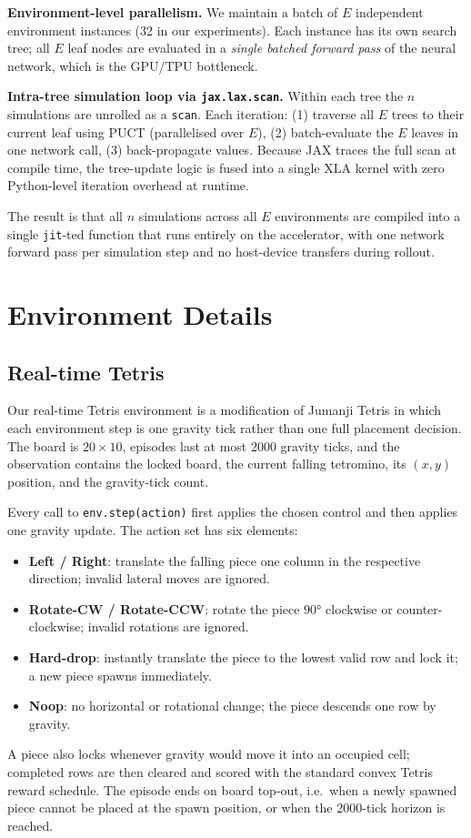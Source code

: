 \textbf{Environment-level parallelism.}
We maintain a batch of $E$ independent environment instances (32 in our experiments).
Each instance has its own search tree; all $E$ leaf nodes are evaluated in a
\emph{single batched forward pass} of the neural network, which is the GPU/TPU
bottleneck.

\textbf{Intra-tree simulation loop via \texttt{jax.lax.scan}.}
Within each tree the $n$ simulations are unrolled as a \texttt{scan}.
Each iteration: (1) traverse all $E$ trees to their current leaf using PUCT
(parallelised over $E$), (2) batch-evaluate the $E$ leaves in one network call,
(3) back-propagate values.
Because JAX traces the full scan at compile time, the tree-update logic is fused
into a single XLA kernel with zero Python-level iteration overhead at runtime.

The result is that all $n$ simulations across all $E$ environments are compiled
into a single \texttt{jit}-ted function that runs entirely on the accelerator,
with one network forward pass per simulation step and no host-device transfers
during rollout.


\section{Environment Details}
\label{app:envs}

\subsection{Real-time Tetris}
\label{app:envs_tetris}

Our real-time Tetris environment is a modification of Jumanji Tetris in which each
environment step is one gravity tick rather than one full placement decision.
The board is $20 \times 10$, episodes last at most 2000 gravity ticks, and the
observation contains the locked board, the current falling tetromino, its
$(x,y)$ position, and the gravity-tick count.

Every call to \texttt{env.step(action)} first applies the chosen control and then
applies one gravity update. The action set has six elements:
\begin{itemize}[nosep]
  \item \textbf{Left / Right}: translate the falling piece one column in the respective
    direction; invalid lateral moves are ignored.
  \item \textbf{Rotate-CW / Rotate-CCW}: rotate the piece $90°$ clockwise or
    counter-clockwise; invalid rotations are ignored.
  \item \textbf{Hard-drop}: instantly translate the piece to the lowest valid row and
    lock it; a new piece spawns immediately.
  \item \textbf{Noop}: no horizontal or rotational change; the piece descends one row
    by gravity.
\end{itemize}
A piece also locks whenever gravity would move it into an occupied cell; completed
rows are then cleared and scored with the standard convex Tetris reward schedule.
The episode ends on board top-out, i.e.\ when a newly spawned piece cannot be placed
at the spawn position, or when the 2000-tick horizon is reached.

